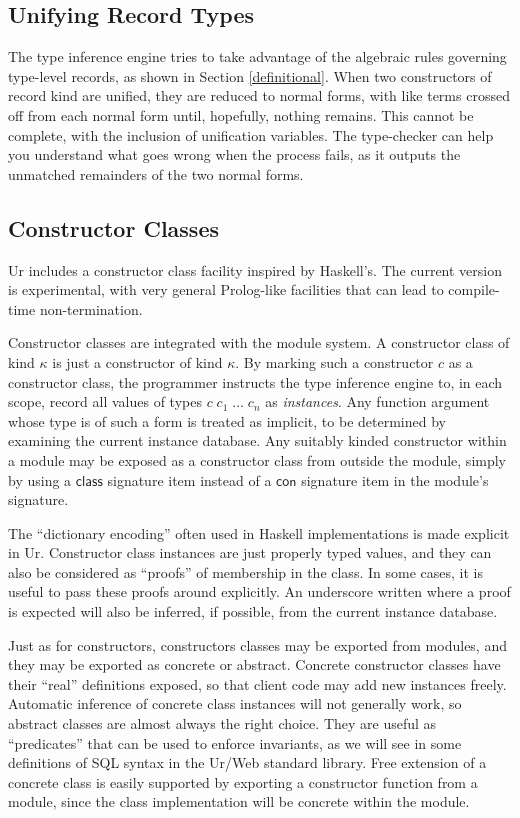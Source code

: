 \documentclass{article}
\newcommand{\mt}[1]{\mathsf{#1}}
\begin{document}
\subsection{Unifying Record Types}

The type inference engine tries to take advantage of the algebraic rules governing type-level records, as shown in Section \ref{definitional}.  When two constructors of record kind are unified, they are reduced to normal forms, with like terms crossed off from each normal form until, hopefully, nothing remains.  This cannot be complete, with the inclusion of unification variables.  The type-checker can help you understand what goes wrong when the process fails, as it outputs the unmatched remainders of the two normal forms.

\subsection{\label{typeclasses}Constructor Classes}

Ur includes a constructor class facility inspired by Haskell's.  The current version is experimental, with very general Prolog-like facilities that can lead to compile-time non-termination.

Constructor classes are integrated with the module system.  A constructor class of kind $\kappa$ is just a constructor of kind $\kappa$.  By marking such a constructor $c$ as a constructor class, the programmer instructs the type inference engine to, in each scope, record all values of types $c \; c_1 \; \ldots \; c_n$ as \emph{instances}.  Any function argument whose type is of such a form is treated as implicit, to be determined by examining the current instance database.  Any suitably kinded constructor within a module may be exposed as a constructor class from outside the module, simply by using a $\mt{class}$ signature item instead of a $\mt{con}$ signature item in the module's signature.

The ``dictionary encoding'' often used in Haskell implementations is made explicit in Ur.  Constructor class instances are just properly typed values, and they can also be considered as ``proofs'' of membership in the class.  In some cases, it is useful to pass these proofs around explicitly.  An underscore written where a proof is expected will also be inferred, if possible, from the current instance database.

Just as for constructors, constructors classes may be exported from modules, and they may be exported as concrete or abstract.  Concrete constructor classes have their ``real'' definitions exposed, so that client code may add new instances freely.  Automatic inference of concrete class instances will not generally work, so abstract classes are almost always the right choice.  They are useful as ``predicates'' that can be used to enforce invariants, as we will see in some definitions of SQL syntax in the Ur/Web standard library.  Free extension of a concrete class is easily supported by exporting a constructor function from a module, since the class implementation will be concrete within the module.
\end{document}
